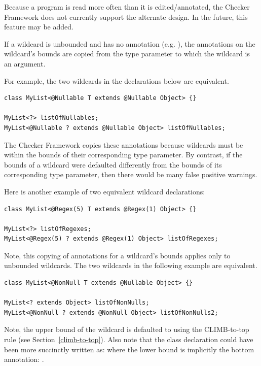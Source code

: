 Because a program is read more often than it is edited/annotated, the
Checker Framework does not currently support the alternate design.  In the
future, this feature may be added.



If a wildcard is unbounded and has no annotation (e.g. ),
the annotations on the wildcard's bounds are copied from the type parameter
to which the wildcard is an argument.

For example, the two wildcards in
the declarations below are equivalent.

\begin{Verbatim}
class MyList<@Nullable T extends @Nullable Object> {}

MyList<?> listOfNullables;
MyList<@Nullable ? extends @Nullable Object> listOfNullables;
\end{Verbatim}

The Checker Framework copies
these annotations because wildcards must be within the bounds of their
corresponding type parameter.
By contrast, if the bounds of a wildcard
were defaulted differently from the bounds of its corresponding type
parameter, then there would be many false positive
 warnings.

Here is another example of two equivalent wildcard declarations:

\begin{Verbatim}
class MyList<@Regex(5) T extends @Regex(1) Object> {}

MyList<?> listOfRegexes;
MyList<@Regex(5) ? extends @Regex(1) Object> listOfRegexes;
\end{Verbatim}

Note, this copying of annotations for a wildcard's bounds applies only to
unbounded wildcards.  The two wildcards in the
following example are equivalent.

\begin{Verbatim}
class MyList<@NonNull T extends @Nullable Object> {}

MyList<? extends Object> listOfNonNulls;
MyList<@NonNull ? extends @NonNull Object> listOfNonNulls2;
\end{Verbatim}

Note, the upper bound of the wildcard  is defaulted to
 using the CLIMB-to-top rule (see Section~\ref{climb-to-top}).
Also note that the  class declaration could have been more succinctly
written as:  where the lower bound
is implicitly the bottom annotation: .

